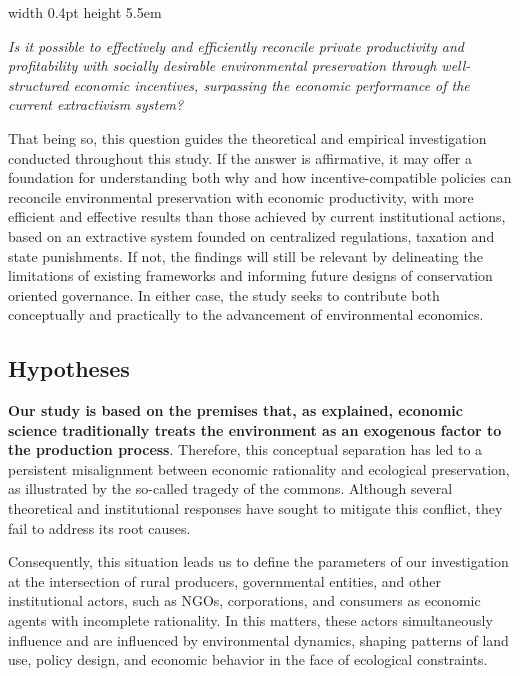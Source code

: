 \begin{flushright}
\begin{minipage}{0.93\linewidth}
\noindent
\hspace{0.4em}\vrule width 0.4pt height 5.5em \hspace{1.2em}%
\parbox[b]{0.95\linewidth}{
\textit{Is it possible to effectively and efficiently reconcile private productivity and profitability with socially desirable environmental preservation through well-structured economic incentives, surpassing the economic performance of the current extractivism system?}
}
\end{minipage}
\end{flushright}

\vspace{1em}

That being so, this question guides the theoretical and empirical investigation conducted throughout this study. If the answer is affirmative, it may offer a foundation for understanding both why and how incentive-compatible policies can reconcile environmental preservation with economic productivity, with more efficient and effective results than those achieved by current institutional actions, based on an extractive system founded on centralized regulations, taxation and state punishments. If not, the findings will still be relevant by delineating the limitations of existing frameworks and informing future designs of conservation oriented governance. In either case, the study seeks to contribute both conceptually and practically to the advancement of environmental economics.

\subsection{Hypotheses}
\textbf{Our study is based on the premises that, as explained, economic science traditionally treats the environment as an exogenous factor to the production process}. Therefore, this conceptual separation has led to a persistent misalignment between economic rationality and ecological preservation, as illustrated by the so-called tragedy of the commons. Although several theoretical and institutional responses have sought to mitigate this conflict, they fail to address its root causes. 

Consequently, this situation leads us to define the parameters of our investigation at the intersection of rural producers,  governmental entities, and other institutional actors, such as NGOs, corporations, and consumers as economic agents with incomplete rationality. In this matters, these actors simultaneously influence and are influenced by environmental dynamics, shaping patterns of land use, policy design, and economic behavior in the face of ecological constraints.

